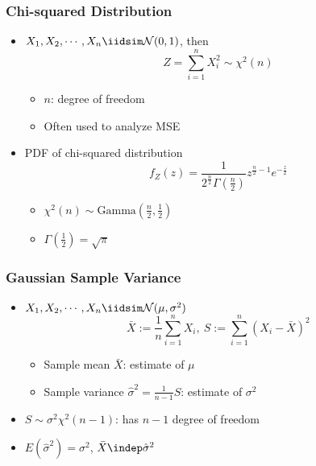 \subsubsection*{Chi-squared Distribution}
\begin{itemize}
    \item $X_1,X_2,\cdots,X_n\iidsim\mathcal{N}(0,1)$, then
    \begin{equation}
        Z=\sum_{i=1}^nX_i^2\sim\chi^2(n)
    \end{equation}
    \begin{itemize}
        \item $n$: degree of freedom
        \item Often used to analyze MSE
    \end{itemize}
    \item PDF of chi-squared distribution
    \begin{equation}
        f_Z(z)=\frac{1}{2^{\frac{n}{2}}\Gamma(\frac{n}{2})}z^{\frac{n}{2}-1}e^{-\frac{z}{2}}
    \end{equation}
    \begin{itemize}
        \item $\chi^2(n)\sim\text{Gamma}\left(\frac{n}{2},\frac{1}{2}\right)$
        \item $\Gamma\left(\frac{1}{2}\right)=\sqrt{\pi}$
    \end{itemize}
\end{itemize}

\subsubsection*{Gaussian Sample Variance}
\begin{itemize}
    \item $X_1,X_2,\cdots,X_n\iidsim\mathcal{N}(\mu,\sigma^2)$
    \begin{equation}
        \bar{X}:=\frac{1}{n}\sum_{i=1}^nX_i,~S:=\sum_{i=1}^n\left(X_i-\bar{X}\right)^2
    \end{equation}
    \begin{itemize}
        \item Sample mean $\bar{X}$: estimate of $\mu$
        \item Sample variance $\hat{\sigma}^2=\frac{1}{n-1}S$: estimate of $\sigma^2$
    \end{itemize}
    \item $S\sim\sigma^2\chi^2(n-1)$: has $n-1$ degree of freedom
    \item $E\left(\hat{\sigma}^2\right)=\sigma^2$, $\bar{X}\indep\hat{\sigma}^2$
\end{itemize}

